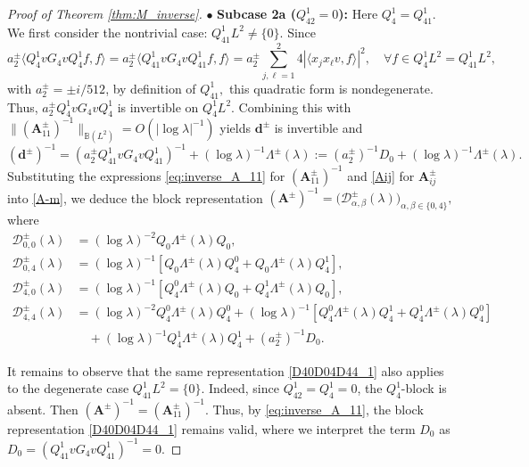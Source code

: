 \documentclass[reqno]{amsart}
\numberwithin{equation}{section}
\begin{document}
\begin{proof}[Proof of Theorem \ref{thm:M_inverse}]
	$\bullet$ \textbf{Subcase 2a ($Q_{42}^1 = 0$):}  
		Here $Q_4^1 = Q_{41}^1$. We first consider the nontrivial case: $
		Q_{41}^1L^2\neq\{0\}.
		$  Since
\begin{equation}\label{eq:positive}
			a_2^\pm \langle Q_{4}^1 v G_4 v Q_{4}^1 f, f \rangle	=a_2^\pm \langle Q_{41}^1 v G_4 v Q_{41}^1 f, f \rangle = a_2^\pm \sum_{j,\ell=1}^2 4 |\langle x_j x_\ell v, f \rangle|^2,\quad \forall f\in Q_4^1 L^2=Q_{41}^1 L^2,
		\end{equation}
		with $a_2^\pm = \pm i/512$, by definition of $Q_{41}^1,$  this quadratic form is nondegenerate. Thus, $a_2^\pm Q_{4}^1 v G_4 v Q_{4}^1$ is invertible on $Q_4^1 L^2$. Combining  this with $\|(\mathbf{A}_{11}^{\pm})^{-1}\|_{\mathbb{B}(L^2)} = O(|\log \lambda|^{-1})$
		yields
		 $\boldsymbol{d}^\pm$ is invertible and 
		$$
		(\boldsymbol{d}^\pm)^{-1} = (a_2^\pm Q_{41}^1 v G_4 v Q_{41}^1)^{-1} + (\log \lambda)^{-1}\Lambda^\pm(\lambda):= (a_2^\pm)^{-1} D_0+ (\log \lambda)^{-1}\Lambda^\pm(\lambda).
		$$
		Substituting the expressions \eqref{eq:inverse_A_11} for $(\mathbf{A}_{11}^{\pm})^{-1}$ and \eqref{Aij} for $\mathbf{A}_{ij}^{\pm}$ into \eqref{A-m}, we deduce the block representation
		$
		(\mathbf{A}^\pm)^{-1} = \big( \mathcal{D}_{\alpha,\beta}^{\pm}(\lambda) \big)_{\alpha,\beta \in \{0,4\}},
		$
		where
	\begin{equation}\label{D40D04D44_1}
			\begin{split}
				\mathcal{D}_{0,0}^{\pm}(\lambda) & = (\log \lambda)^{-2} Q_0 \Lambda^\pm(\lambda) Q_0, \\
				\mathcal{D}_{0,4}^{\pm}(\lambda) &= (\log \lambda)^{-1} \left[ Q_0 \Lambda^\pm(\lambda) Q_4^0 + Q_0 \Lambda^\pm(\lambda) Q_{4}^1 \right] , \\
				\mathcal{D}_{4,0}^{\pm}(\lambda) &= (\log \lambda)^{-1} \left[ Q_4^0 \Lambda^\pm(\lambda) Q_0 + Q_{4}^1 \Lambda^\pm(\lambda) Q_0 \right], \\
				\mathcal{D}_{4,4}^{\pm}(\lambda) &= (\log \lambda)^{-2} Q_4^0 \Lambda^\pm(\lambda) Q_4^0
				+ (\log \lambda)^{-1} \left[ Q_4^0 \Lambda^\pm(\lambda) Q_{4}^1 + Q_{4}^1 \Lambda^\pm(\lambda) Q_4^0 \right] \\
				& \quad + (\log \lambda)^{-1}Q_{4}^1 \Lambda^\pm(\lambda) Q_{4}^1+(a_2^\pm)^{-1} D_0.
			\end{split}
		\end{equation}
        
	It remains to observe that the same representation \eqref{D40D04D44_1} also applies to the degenerate case
		$Q_{41}^1L^2=\{0\}$.
		Indeed, since $Q_{42}^1=Q_4^1=0$, the $Q_4^1$-block is absent. Then
		$(\mathbf A^\pm)^{-1}=(\mathbf A_{11}^\pm)^{-1}$.
		Thus, by \eqref{eq:inverse_A_11}, the block representation \eqref{D40D04D44_1} remains valid, where we interpret the term $D_0$ as
		$
		D_0
		=
		\left(
		Q_{41}^1vG_4vQ_{41}^1
		\right)^{-1}=0.
		$
		

\end{proof}
\end{document}
